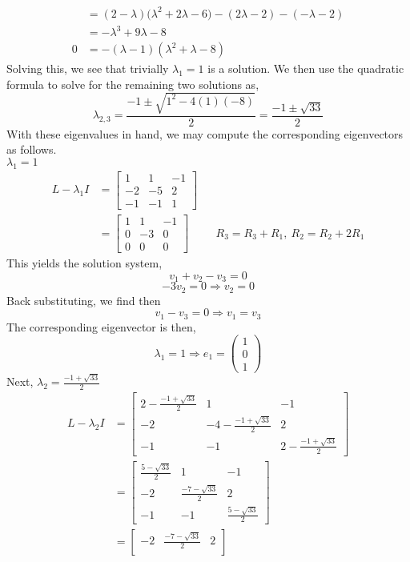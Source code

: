 \documentclass[letterpaper,10pt]{article}
\begin{document}
\begin{enumerate}
\begin{align*}
&=(2-\lambda)\big(\lambda^2+2\lambda-6)-(2\lambda-2)-(-\lambda-2)\\
&=-\lambda^3+9\lambda-8\\
0 &= -(\lambda-1)(\lambda^2+\lambda-8)
\end{align*}
Solving this, we see that trivially $\lambda_1=1$ is a solution. We then use the quadratic formula to solve for the remaining two solutions as,
\[\lambda_{2,3}=\frac{-1\pm \sqrt{1^2-4(1)(-8)}}{2}=\frac{-1\pm \sqrt{33}}{2}\]
With these eigenvalues in hand, we may compute the corresponding eigenvectors as follows.\\
$\lambda_1=1$
\begin{align*}
L-\lambda_1 I &= \begin{bmatrix}
1 & 1 & -1\\
-2 & -5 & 2\\
-1 & -1 & 1
\end{bmatrix}\\
&= \begin{bmatrix}
1 & 1 & -1\\
0 & -3 & 0\\
0 & 0 & 0
\end{bmatrix} && R_3=R_3+R_1,\ R_2=R_2+2R_1
\end{align*}
This yields the solution system,
\[v_1+v_2-v_3=0\]
\[-3v_2=0\Rightarrow v_2=0\]
Back substituting, we find then
\[v_1-v_3=0\Rightarrow v_1=v_3\]
The corresponding eigenvector is then,
\[\lambda_1=1\Rightarrow e_1=\begin{pmatrix}
1\\0\\1
\end{pmatrix}\]
Next, $\lambda_2=\frac{-1+\sqrt{33}}{2}$
\begin{align*}
L-\lambda_2 I &= \begin{bmatrix}
2-\frac{-1+\sqrt{33}}{2} & 1 & -1\\
-2 & -4-\frac{-1+\sqrt{33}}{2} & 2\\
-1 & -1 & 2-\frac{-1+\sqrt{33}}{2}
\end{bmatrix}\\
&=\begin{bmatrix}
\frac{5-\sqrt{33}}{2} & 1 & -1\\
-2 & \frac{-7-\sqrt{33}}{2} & 2\\
-1 & -1 & \frac{5-\sqrt{33}}{2}
\end{bmatrix}\\
&=\begin{bmatrix}
-2 & \frac{-7-\sqrt{33}}{2} & 2\\

\end{bmatrix}
\end{align*}
\end{enumerate}
\end{document}
